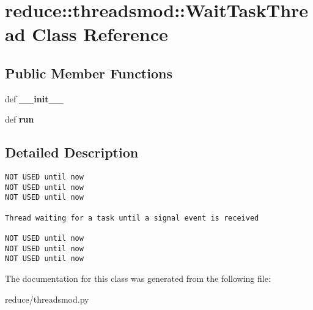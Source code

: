 \section{reduce::threadsmod::Wait\-Task\-Thread Class Reference}
\label{classreduce_1_1threadsmod_1_1WaitTaskThread}
\subsection*{Public Member Functions}
\begin{CompactItemize}
\item 
def \textbf{\_\-\_\-init\_\-\_\-}\label{classreduce_1_1threadsmod_1_1WaitTaskThread_f644ca33ce0f909b9c712be9bbc66f99}

\item 
def \textbf{run}\label{classreduce_1_1threadsmod_1_1WaitTaskThread_1957bc7b47b8ae618751318bd4d5a824}

\end{CompactItemize}


\subsection{Detailed Description}


\footnotesize\begin{verbatim}
NOT USED until now
NOT USED until now
NOT USED until now

Thread waiting for a task until a signal event is received

NOT USED until now
NOT USED until now
NOT USED until now

\end{verbatim}
\normalsize
 



The documentation for this class was generated from the following file:\begin{CompactItemize}
\item 
reduce/threadsmod.py\end{CompactItemize}
